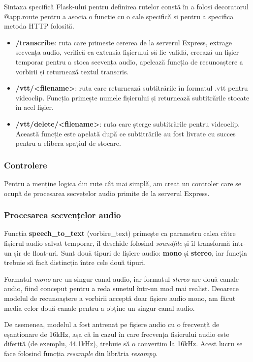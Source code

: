 Sintaxa specifică Flask-ului pentru definirea rutelor constă în a folosi decoratorul @app.route
pentru a asocia o funcție cu o cale specifică și pentru a specifica metoda HTTP folosită.

\begin{itemize}
    \item \textbf{/transcribe}: ruta care primește cererea de la serverul Express, extrage secvența
    audio, verifică ca extensia fișierului să fie validă, creează un fișier temporar pentru a stoca
    secvența audio, apelează funcția de recunoaștere a vorbirii și returnează textul transcris.
    \item \textbf{/vtt/<filename>}: ruta care returnează subtitrările în formatul .vtt pentru videoclip.
    Funcția primește numele fișierului și returnează subtitrările stocate în acel fișier.
    \item \textbf{/vtt/delete/<filename>}: ruta care șterge subtitrările pentru videoclip. Această 
    funcție este apelată după ce subtitrările au fost livrate cu succes pentru a elibera spațiul de stocare.
\end{itemize}


\subsubsection{Controlere}
Pentru a menține logica din rute cât mai simplă, am creat un controler care se ocupă de procesarea
secvețelor audio primite de la serverul Express. 

\subsubsection{Procesarea secvențelor audio}
\par
Funcția \textbf{speech\_to\_text} (vorbire\_text) primește ca parametru calea către fișierul audio salvat temporar,
îl deschide folosind \textit{soundfile} și îl transformă într-un șir de float-uri.
Sunt două tipuri de fișiere audio: \textbf{mono} și \textbf{stereo}, iar funcția trebuie să facă distincția
între cele două tipuri. 

\par
Formatul \textit{mono} are un singur canal audio, iar formatul \textit{stereo} are două canale audio, 
fiind conceput pentru a reda sunetul într-un mod mai realist. Deoarece modelul de recunoaștere a vorbirii
acceptă doar fișiere audio mono, am făcut media celor două canale pentru a obține un singur canal audio.

\par
De asemenea, modelul a fost antrenat pe fișiere audio cu o frecvență de eșantionare de 16kHz, așa că
în cazul în care frecvența fișierului audio este diferită (de exemplu, 44.1kHz), trebuie să o convertim
la 16kHz. Acest lucru se face folosind funcția \textit{resample} din librăria \textit{resampy}.


